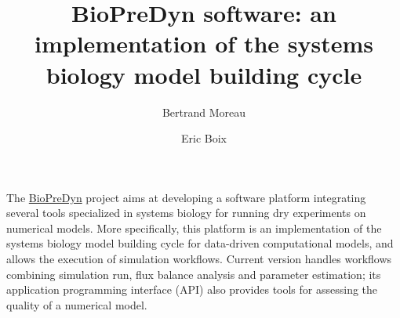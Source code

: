 \documentclass{llncs}
\begin{document}
\title{BioPreDyn software: an implementation of the systems biology model
building cycle}
\author{Bertrand Moreau \and Eric Boix}
\maketitle

The \href{http://www.biopredyn.eu/}{BioPreDyn} project aims at developing a
software platform integrating several tools specialized in systems biology for
running dry experiments on numerical models. More specifically, this platform
is an implementation of the systems biology model building cycle for data-driven
computational models\cite{Kitano2002}, and allows the execution of simulation
workflows. Current version handles workflows combining simulation run, flux
balance analysis and parameter estimation; its application programming
interface (API) also provides tools for assessing the quality of a numerical
model.
\end{document}
